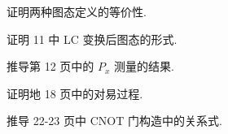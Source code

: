 \documentclass{assignment}
\begin{document}
\begin{prob}
    证明两种图态定义的等价性.
\end{prob}
\begin{sol}
    
\end{sol}

\begin{prob}
    证明 11 中 LC 变换后图态的形式.
\end{prob}
\begin{sol}
    
\end{sol}

\begin{prob}
    推导第 12 页中的 $P_x$ 测量的结果.
\end{prob}
\begin{sol}
    
\end{sol}

\begin{prob}
    证明地 18 页中的对易过程.
\end{prob}
\begin{sol}
    
\end{sol}

\begin{prob}
    推导 22-23 页中 CNOT 门构造中的关系式.
\end{prob}
\begin{sol}
    
\end{sol}
\end{document}

